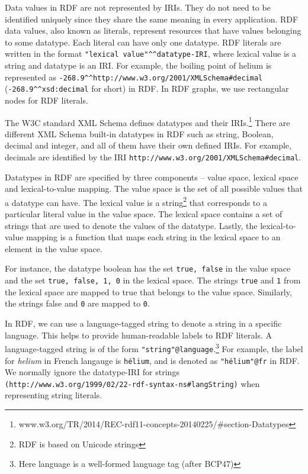 Data values in RDF are not represented by IRIs. They do not need to be identified uniquely since they share the same meaning in every application. RDF data values, also known as literals, represent resources that have values belonging to some datatype. Each literal can have only one datatype. RDF literals are written in the format \texttt{"lexical value"\textasciicircum \textasciicircum datatype-IRI}, where lexical value is a string and datatype is an IRI. For example, the boiling point of helium is represented as \texttt{-268.9\textasciicircum \textasciicircum http://www.w3.org/2001/XMLSchema\#decimal} (\texttt{-268.9\textasciicircum \textasciicircum xsd:decimal} for short) in RDF. In RDF graphs, we use rectangular nodes for RDF literals.

The W3C standard XML Schema defines datatypes and their IRIs.\footnote{www.w3.org/TR/2014/REC-rdf11-concepts-20140225/\#section-Datatypes} There are different XML Schema built-in datatypes in RDF such as string, Boolean, decimal and integer, and all of them have their own defined IRIs. For example, decimals are identified by the IRI \texttt{http://www.w3.org/2001/XMLSchema\#decimal}. 

Datatypes in RDF are specified by three components – value space, lexical space and lexical-to-value mapping. The value space is the set of all possible values that a datatype can have. The lexical value is a string\footnote{RDF is based on Unicode strings} that corresponds to a particular literal value in the value space. The lexical space contains a set of strings that are used to denote the values of the datatype. Lastly, the lexical-to-value mapping is a function that maps each string in the lexical space to an element in the value space. 

For instance, the datatype boolean has the set \texttt{{true, false}} in the value space and the set \texttt{{true, false, 1, 0}} in the lexical space. The strings \texttt{true} and \texttt{1} from the lexical space are mapped to true that belongs to the value space. Similarly, the strings false and \texttt{0} are mapped to \texttt{0}. 

In RDF, we can use a language-tagged string to denote a string in a specific language. This helps to provide human-readable labels to RDF literals. A language-tagged string is of the form \texttt{"string"@language}.\footnote{Here language is a well-formed language tag (after BCP47)} For example, the label for \textit{helium} in French langauge is \texttt{hélium}, and is denoted as \texttt{"hélium"@fr} in RDF. We normally ignore the datatype-IRI for strings \texttt{(http://www.w3.org/1999/02/22-rdf-syntax-ns\#langString)} when representing string literals. 

